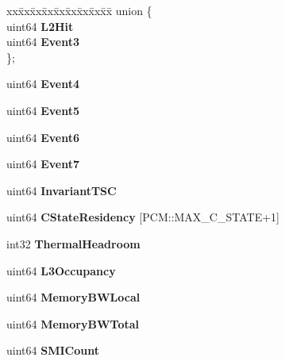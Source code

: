 \begin{DoxyCompactItemize}
\begin{tabbing}
\end{tabbing}\item 
\mbox{\label{classBasicCounterState_a0f32ff172f3d99aa74296c6750f630a8}} 
\begin{tabbing}
xx\=xx\=xx\=xx\=xx\=xx\=xx\=xx\=xx\=\kill
union \{\\
\>uint64 {\bfseries L2Hit}\\
\>uint64 {\bfseries Event3}\\
\}; \\

\end{tabbing}\item 
\mbox{\label{classBasicCounterState_ab70fc472616112455cf687226177e079}} 
uint64 {\bfseries Event4}
\item 
\mbox{\label{classBasicCounterState_aa2dc9b03082eb9f99e40afee0318a7cc}} 
uint64 {\bfseries Event5}
\item 
\mbox{\label{classBasicCounterState_a1e411e37235aa1315e5db22b1822192c}} 
uint64 {\bfseries Event6}
\item 
\mbox{\label{classBasicCounterState_adb49779bbfbdf23fdeea7764ddeb01eb}} 
uint64 {\bfseries Event7}
\item 
\mbox{\label{classBasicCounterState_af357162e5b43c6dfc0ce92fd56fa30a0}} 
uint64 {\bfseries Invariant\+T\+SC}
\item 
\mbox{\label{classBasicCounterState_af9069c972052bac5ed648e519e03da9c}} 
uint64 {\bfseries C\+State\+Residency} [P\+C\+M\+::\+M\+A\+X\+\_\+\+C\+\_\+\+S\+T\+A\+TE+1]
\item 
\mbox{\label{classBasicCounterState_a4950fe3761b2ac599a7ae64ec7bee973}} 
int32 {\bfseries Thermal\+Headroom}
\item 
\mbox{\label{classBasicCounterState_a99dab23e20418b86be72dda1ecd8858c}} 
uint64 {\bfseries L3\+Occupancy}
\item 
\mbox{\label{classBasicCounterState_a115320ce0518d55acd0db90c127419b8}} 
uint64 {\bfseries Memory\+B\+W\+Local}
\item 
\mbox{\label{classBasicCounterState_a97a5bc9ad3dc45a876a34740537e54a8}} 
uint64 {\bfseries Memory\+B\+W\+Total}
\item 
\mbox{\label{classBasicCounterState_a1776fe74136c0e204c68885f23989828}} 
uint64 {\bfseries S\+M\+I\+Count}
\end{DoxyCompactItemize}
